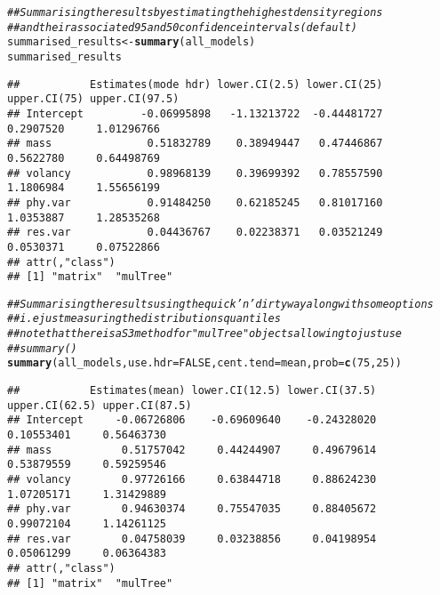 \documentclass{article}\usepackage[]{graphicx}\usepackage[]{color}
\makeatletter
\newcommand{\hlnum}[1]{\textcolor[rgb]{0.686,0.059,0.569}{#1}}%
\newcommand{\hlcom}[1]{\textcolor[rgb]{0.678,0.584,0.686}{\textit{#1}}}%
\newcommand{\hlstd}[1]{\textcolor[rgb]{0.345,0.345,0.345}{#1}}%
\newcommand{\hlkwb}[1]{\textcolor[rgb]{0.69,0.353,0.396}{#1}}%
\newcommand{\hlkwc}[1]{\textcolor[rgb]{0.333,0.667,0.333}{#1}}%
\newcommand{\hlkwd}[1]{\textcolor[rgb]{0.737,0.353,0.396}{\textbf{#1}}}%
\newenvironment{kframe}{%
 \def\at@end@of@kframe{}%
 \ifinner\ifhmode%
  \def\at@end@of@kframe{\end{minipage}}%
  \begin{minipage}{\columnwidth}%
 \fi\fi%
 \def\FrameCommand##1{\hskip\@totalleftmargin \hskip-\fboxsep
 \colorbox{shadecolor}{##1}\hskip-\fboxsep
     \hskip-\linewidth \hskip-\@totalleftmargin \hskip\columnwidth}%
 \MakeFramed {\advance\hsize-\width
   \@totalleftmargin\z@ \linewidth\hsize
   \@setminipage}}%
 {\par\unskip\endMakeFramed%
 \at@end@of@kframe}
\newenvironment{knitrout}{}{} %
\makeatother
\begin{document}
\begin{knitrout}
\color{fgcolor}\begin{kframe}
\begin{alltt}
\hlcom{## Summarising the results by estimating the highest density regions}
\hlcom{## and their associated 95 and 50 confidence intervals (default)}
\hlstd{summarised_results} \hlkwb{<-} \hlkwd{summary}\hlstd{(all_models)}
\hlstd{summarised_results}
\end{alltt}
\begin{verbatim}
##           Estimates(mode hdr) lower.CI(2.5) lower.CI(25) upper.CI(75) upper.CI(97.5)
## Intercept         -0.06995898   -1.13213722  -0.44481727    0.2907520     1.01296766
## mass               0.51832789    0.38949447   0.47446867    0.5622780     0.64498769
## volancy            0.98968139    0.39699392   0.78557590    1.1806984     1.55656199
## phy.var            0.91484250    0.62185245   0.81017160    1.0353887     1.28535268
## res.var            0.04436767    0.02238371   0.03521249    0.0530371     0.07522866
## attr(,"class")
## [1] "matrix"  "mulTree"
\end{verbatim}
\begin{alltt}
\hlcom{## Summarising the results using the quick 'n' dirty way along with some options}
\hlcom{## i.e just measuring the distributions quantiles}
\hlcom{## note that there is a S3 method for "mulTree" objects allowing to just use}
\hlcom{## summary()}
\hlkwd{summary}\hlstd{(all_models,} \hlkwc{use.hdr} \hlstd{=} \hlnum{FALSE}\hlstd{,} \hlkwc{cent.tend} \hlstd{= mean,} \hlkwc{prob} \hlstd{=} \hlkwd{c}\hlstd{(}\hlnum{75}\hlstd{,} \hlnum{25}\hlstd{))}
\end{alltt}
\begin{verbatim}
##           Estimates(mean) lower.CI(12.5) lower.CI(37.5) upper.CI(62.5) upper.CI(87.5)
## Intercept     -0.06726806    -0.69609640    -0.24328020     0.10553401     0.56463730
## mass           0.51757042     0.44244907     0.49679614     0.53879559     0.59259546
## volancy        0.97726166     0.63844718     0.88624230     1.07205171     1.31429889
## phy.var        0.94630374     0.75547035     0.88405672     0.99072104     1.14261125
## res.var        0.04758039     0.03238856     0.04198954     0.05061299     0.06364383
## attr(,"class")
## [1] "matrix"  "mulTree"
\end{verbatim}
\end{kframe}
\end{knitrout}
\end{document}

